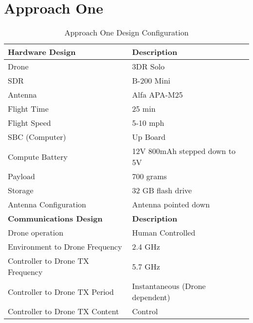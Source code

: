 \section{Approach One}
\begin{table}[ht]
\centering
\caption{Approach One Design Configuration}
\label{table:approach_one}
\begin{tabular}{|l|l|}
    \hline  \textbf{Hardware Design}              & \textbf{Description}                      \\ \hline
            Drone                                 & 3DR Solo                                  \\
            SDR                                   & B-200 Mini                                \\
            Antenna                               & Alfa APA-M25                              \\
            Flight Time                           & 25 min                                    \\
            Flight Speed                          & 5-10 mph                                  \\
            SBC (Computer)                        & Up Board                                  \\
            Compute Battery                       & 12V 800mAh stepped down to 5V             \\
            Payload                               & 700 grams                                 \\
            Storage                               & 32 GB flash drive                         \\
            Antenna Configuration                 & Antenna pointed down                      \\
    \hline  \textbf{Communications Design}        & \textbf{Description}                      \\ \hline
            Drone operation                       & Human Controlled                          \\
            Environment to Drone Frequency        & 2.4 GHz                                   \\
            Controller to Drone TX Frequency      & 5.7 GHz                                   \\
            Controller to Drone TX Period         & Instantaneous (Drone dependent)           \\
            Controller to Drone TX Content        & Control                                   \\

\end{tabular}
\end{table}
